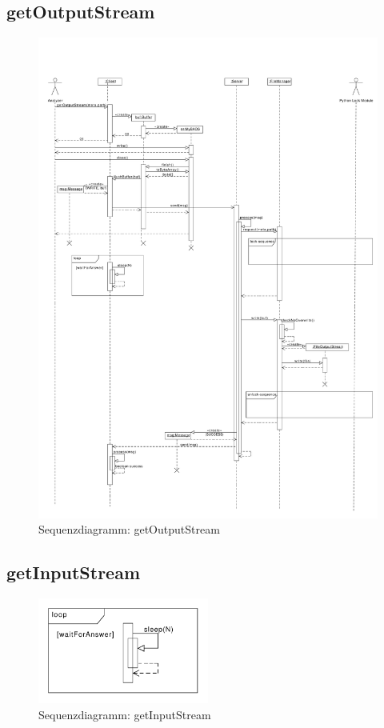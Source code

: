 \subsection {getOutputStream}
\begin{figure}[h]
	\centering
	\label{dia:design:frontend:sqc:getOutputStream}
	\includegraphics[width=\textwidth]{design/frontend/sequence/get-output-stream-sequence.pdf}
	\caption{Sequenzdiagramm: getOutputStream}
\end{figure}

\subsection {getInputStream}
\begin{figure}[!h]
	\centering
	\label{dia:design:frontend:sqc:getInputStream}
	\includegraphics[width=0.5\textwidth]{design/frontend/sequence/get-input-stream-sequence.pdf}
	\caption{Sequenzdiagramm: getInputStream}
\end{figure}

